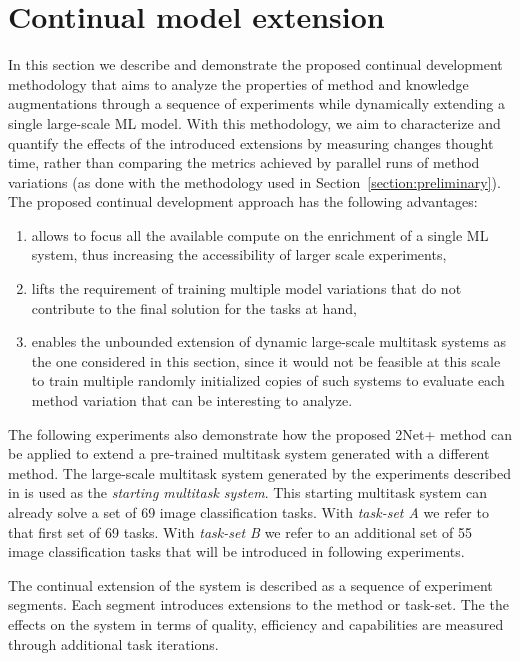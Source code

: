 \documentclass{article} \usepackage{iclr2023_conference,times}
\newcommand{\method}{2Net+\xspace}
\begin{document}
\section{Continual model extension}


\label{section:experiments}

In this section we describe and demonstrate the proposed continual development methodology that aims to analyze the properties of method and knowledge augmentations through a sequence of experiments while dynamically extending a single large-scale ML model.
With this methodology, we aim to characterize and quantify the effects of the introduced extensions by measuring changes thought time, rather than comparing the metrics achieved by parallel runs of method variations (as done with the methodology used in Section~\ref{section:preliminary}).
The proposed continual development approach has the following advantages:
\begin{enumerate}
\item allows to focus all the available compute on the enrichment of a single ML system, thus increasing the accessibility of larger scale experiments,
\item lifts the requirement of training multiple model variations that do not contribute to the final solution for the tasks at hand,
\item enables the unbounded extension of dynamic large-scale multitask systems as the one considered in this section, since it would not be feasible at this scale to train multiple randomly initialized copies of such systems to evaluate each method variation that can be interesting to analyze.
\end{enumerate}

The following experiments also demonstrate how the proposed \method method can be applied to extend a pre-trained multitask system generated with a different method.
The large-scale multitask system generated by the experiments described in \citep{Gesmundo2022munet2} is used as the \emph{starting multitask system}. This starting multitask system can already solve a set of 69 image classification tasks.
With \emph{task-set A} we refer to that first set of 69 tasks.
With \emph{task-set B} we refer to an additional set of 55 image classification tasks that will be introduced in following experiments.

The continual extension of the system is described as a sequence of experiment segments.
Each segment introduces extensions to the method or task-set.
The the effects on the system in terms of quality, efficiency and capabilities are measured through additional task iterations.
\end{document}
